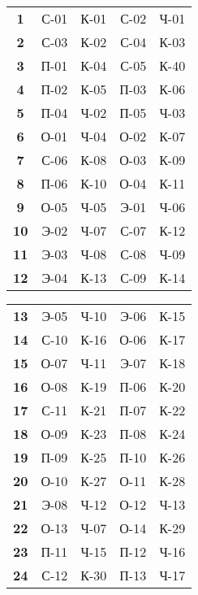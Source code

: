 \documentclass[12pt]{article}
\begin{document}
\begin{multicols}{3}

\begin{tabular}{c|rrrr}
\textbf{1}  & {С-01} & {К-01} & {С-02} & {Ч-01} \\
\textbf{2}  & {С-03} & {К-02} & {С-04} & {К-03} \\
\textbf{3}  & {П-01} & {К-04} & {С-05} & {К-40} \\
\textbf{4}  & {П-02} & {К-05} & {П-03} & {К-06} \\
\textbf{5}  & {П-04} & {Ч-02} & {П-05} & {Ч-03} \\
\textbf{6}  & {О-01} & {Ч-04} & {О-02} & {К-07} \\
\textbf{7}  & {С-06} & {К-08} & {О-03} & {К-09} \\
\textbf{8}  & {П-06} & {К-10} & {О-04} & {К-11} \\
\textbf{9}  & {О-05} & {Ч-05} & {Э-01} & {Ч-06} \\
\textbf{10} & {Э-02} & {Ч-07} & {С-07} & {К-12} \\
\textbf{11} & {Э-03} & {Ч-08} & {С-08} & {Ч-09} \\
\textbf{12} & {Э-04} & {К-13} & {С-09} & {К-14} \\
\end{tabular}

\begin{tabular}{c|rrrr}
\textbf{13} & {Э-05} & {Ч-10} & {Э-06} & {К-15} \\
\textbf{14} & {С-10} & {К-16} & {О-06} & {К-17} \\
\textbf{15} & {О-07} & {Ч-11} & {Э-07} & {К-18} \\
\textbf{16} & {О-08} & {К-19} & {П-06} & {К-20} \\
\textbf{17} & {С-11} & {К-21} & {П-07} & {К-22} \\
\textbf{18} & {О-09} & {К-23} & {П-08} & {К-24} \\
\textbf{19} & {П-09} & {К-25} & {П-10} & {К-26} \\
\textbf{20} & {О-10} & {К-27} & {О-11} & {К-28} \\
\textbf{21} & {Э-08} & {Ч-12} & {О-12} & {Ч-13} \\
\textbf{22} & {О-13} & {Ч-07} & {О-14} & {К-29} \\
\textbf{23} & {П-11} & {Ч-15} & {П-12} & {Ч-16} \\
\textbf{24} & {С-12} & {К-30} & {П-13} & {Ч-17} \\
\end{tabular}


\end{multicols}
\end{document}
